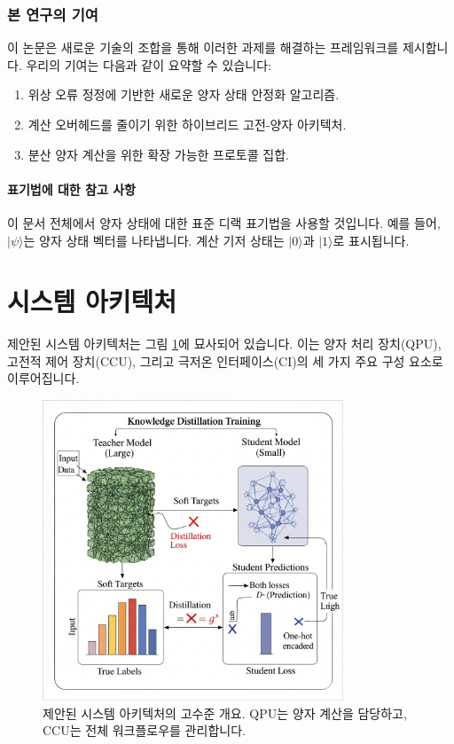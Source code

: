 \subsubsection{본 연구의 기여}
이 논문은 새로운 기술의 조합을 통해 이러한 과제를 해결하는 프레임워크를 제시합니다. 우리의 기여는 다음과 같이 요약할 수 있습니다:
\begin{enumerate}
    \item 위상 오류 정정에 기반한 새로운 양자 상태 안정화 알고리즘.
    \item 계산 오버헤드를 줄이기 위한 하이브리드 고전-양자 아키텍처.
    \item 분산 양자 계산을 위한 확장 가능한 프로토콜 집합.
\end{enumerate}

\paragraph{표기법에 대한 참고 사항}
이 문서 전체에서 양자 상태에 대한 표준 디랙 표기법을 사용할 것입니다. 예를 들어, $|\psi\rangle$는 양자 상태 벡터를 나타냅니다. 계산 기저 상태는 $|0\rangle$과 $|1\rangle$로 표시됩니다.

\section{시스템 아키텍처}
제안된 시스템 아키텍처는 그림 \ref{fig:system_overview}에 묘사되어 있습니다. 이는 양자 처리 장치(QPU), 고전적 제어 장치(CCU), 그리고 극저온 인터페이스(CI)의 세 가지 주요 구성 요소로 이루어집니다.

\begin{figure}[h!]
    \centering
    \includegraphics[width=0.8\textwidth]{figures/example_figure.png}
    \caption{제안된 시스템 아키텍처의 고수준 개요. QPU는 양자 계산을 담당하고, CCU는 전체 워크플로우를 관리합니다.}
    \label{fig:system_overview}
\end{figure}

